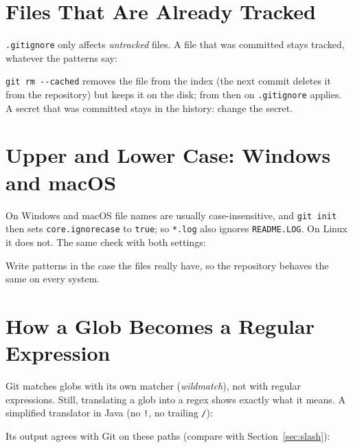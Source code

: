 \documentclass[11pt,a4paper]{article}
\begin{document}
\section{Files That Are Already Tracked}


\texttt{.gitignore} only affects \emph{untracked} files. A file that was committed stays tracked, whatever the patterns say:


\texttt{git rm -{}-cached} removes the file from the index (the next commit deletes it from the repository) but keeps it on the disk;
from then on \texttt{.gitignore} applies. A secret that was committed stays in the history: change the secret.



\section{Upper and Lower Case: Windows and macOS}


On Windows and macOS file names are usually case-insensitive, and \texttt{git init} then sets
\texttt{core.ignorecase} to \texttt{true}; so \texttt{*.log} also ignores \texttt{README.LOG}. On Linux it does not. The same check with both settings:


Write patterns in the case the files really have, so the repository behaves the same on every system.



\section{How a Glob Becomes a Regular Expression}


Git matches globs with its own matcher (\emph{wildmatch}), not with regular expressions. Still, translating a glob into a regex
shows exactly what it means. A simplified translator in Java (no \texttt{!}, no trailing \texttt{/}):


Its output agrees with Git on these paths (compare with Section~\ref{sec:slash}):
\end{document}
